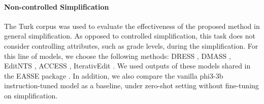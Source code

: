 \paragraph{Non-controlled Simplification}
The Turk corpus was used to evaluate the effectiveness of the proposed method in general simplification. 
As opposed to controlled simplification, this task does not consider controlling attributes, such as grade levels, during the simplification.
For this line of models, we choose the following methods: DRESS \cite{zhang-lapata-2017-sentence}, DMASS \cite{zhao-etal-2018-integrating}, EditNTS \cite{dong-etal-2019-editnts}, ACCESS \cite{martin-etal-2020-controllable}, IterativEdit \cite{kumar-etal-2020-iterative}. 
We used outputs of these models shared in the EASSE package \cite{alva-manchego-etal-2019-easse}.   
In addition, we also compare the vanilla phi3-3b instruction-tuned model as a baseline, under zero-shot setting without fine-tuning on simplification. 







